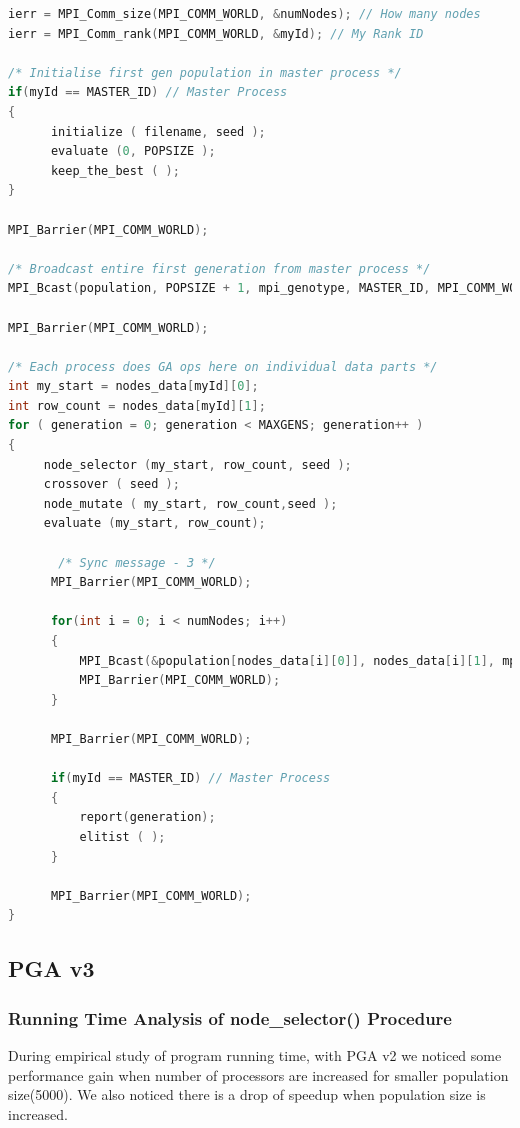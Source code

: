 \begin{lstlisting}[language=C, caption={PGA v2 main() procedures.}, label={lst:pga_procedures}]
ierr = MPI_Comm_size(MPI_COMM_WORLD, &numNodes); // How many nodes
ierr = MPI_Comm_rank(MPI_COMM_WORLD, &myId); // My Rank ID
    
/* Initialise first gen population in master process */   
if(myId == MASTER_ID) // Master Process
{        
      initialize ( filename, seed );
      evaluate (0, POPSIZE );
      keep_the_best ( );
}

MPI_Barrier(MPI_COMM_WORLD);
   
/* Broadcast entire first generation from master process */
MPI_Bcast(population, POPSIZE + 1, mpi_genotype, MASTER_ID, MPI_COMM_WORLD);
   
MPI_Barrier(MPI_COMM_WORLD);
 
/* Each process does GA ops here on individual data parts */ 
int my_start = nodes_data[myId][0];
int row_count = nodes_data[myId][1];
for ( generation = 0; generation < MAXGENS; generation++ )
{      
     node_selector (my_start, row_count, seed );
     crossover ( seed );
     node_mutate ( my_start, row_count,seed );   
     evaluate (my_start, row_count);
         
       /* Sync message - 3 */
      MPI_Barrier(MPI_COMM_WORLD);
        
      for(int i = 0; i < numNodes; i++)
      {
          MPI_Bcast(&population[nodes_data[i][0]], nodes_data[i][1], mpi_genotype, i, MPI_COMM_WORLD);
          MPI_Barrier(MPI_COMM_WORLD);
      }
        
      MPI_Barrier(MPI_COMM_WORLD);
        
      if(myId == MASTER_ID) // Master Process
      {
          report(generation);
          elitist ( );
      }
        
      MPI_Barrier(MPI_COMM_WORLD);
}
\end{lstlisting}

\subsection{PGA v3}

\subsubsection{Running Time Analysis of node\_selector() Procedure}
\label{pga_runtime_analysis}
During empirical study of program running time, with PGA v2 we noticed some performance gain when number of processors are increased for smaller population size(5000). We also noticed there is a drop of speedup when population size is increased.

